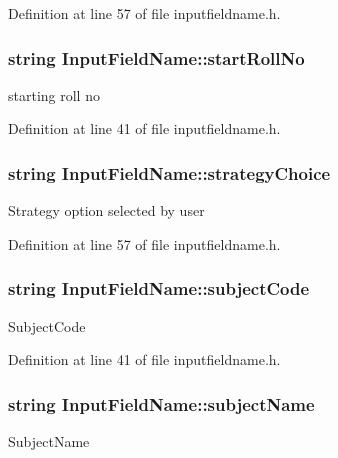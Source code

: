 Definition at line 57 of file inputfieldname.\-h.

\hypertarget{classInputFieldName_a24baf5c915b4ee0fb8678e03adec043a}{
\subsubsection[{start\-Roll\-No}]{\setlength{\rightskip}{0pt plus 5cm}string Input\-Field\-Name\-::start\-Roll\-No}}\label{classInputFieldName_a24baf5c915b4ee0fb8678e03adec043a}
starting roll no 

Definition at line 41 of file inputfieldname.\-h.

\hypertarget{classInputFieldName_a9a6b827d404cb279cc0ed836c069e4a9}{
\subsubsection[{strategy\-Choice}]{\setlength{\rightskip}{0pt plus 5cm}string Input\-Field\-Name\-::strategy\-Choice}}\label{classInputFieldName_a9a6b827d404cb279cc0ed836c069e4a9}
Strategy option selected by user 

Definition at line 57 of file inputfieldname.\-h.

\hypertarget{classInputFieldName_af1cc6871c33344c365e6e25ea482bd48}{
\subsubsection[{subject\-Code}]{\setlength{\rightskip}{0pt plus 5cm}string Input\-Field\-Name\-::subject\-Code}}\label{classInputFieldName_af1cc6871c33344c365e6e25ea482bd48}
Subject\-Code 

Definition at line 41 of file inputfieldname.\-h.

\hypertarget{classInputFieldName_a0614731b959afef6bb00f9fc957e7521}{
\subsubsection[{subject\-Name}]{\setlength{\rightskip}{0pt plus 5cm}string Input\-Field\-Name\-::subject\-Name}}\label{classInputFieldName_a0614731b959afef6bb00f9fc957e7521}
Subject\-Name 

